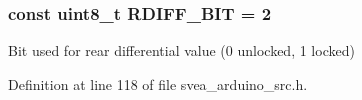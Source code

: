 \subsubsection[{\texorpdfstring{R\+D\+I\+F\+F\+\_\+\+B\+IT}{RDIFF_BIT}}]{\setlength{\rightskip}{0pt plus 5cm}const uint8\+\_\+t R\+D\+I\+F\+F\+\_\+\+B\+IT = 2}\hypertarget{group__MsgBitPositions_ga4f5aa3ea23a63189068319996dc40fc5}{}\label{group__MsgBitPositions_ga4f5aa3ea23a63189068319996dc40fc5}
Bit used for rear differential value (0 unlocked, 1 locked) 

Definition at line 118 of file svea\+\_\+arduino\+\_\+src.\+h.

